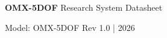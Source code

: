 \documentclass[a4paper,landscape,10pt]{article}
\begin{document}
\noindent
\colorbox{maincolor}{
    \parbox{\dimexpr\linewidth-2\fboxsep}{
        \vspace{8pt}
        
        {\color{white}\Large\textbf{OMX-5DOF}} \hfill
        {\color{white}\small Research System Datasheet}
        
        \vspace{2pt}
        
        {\color{white}\small Model: OMX-5DOF} \hfill
        {\color{white}\small Rev 1.0 | 2026}
        
        \vspace{8pt}
    }
}
\vspace{0.4cm}
\end{document}
